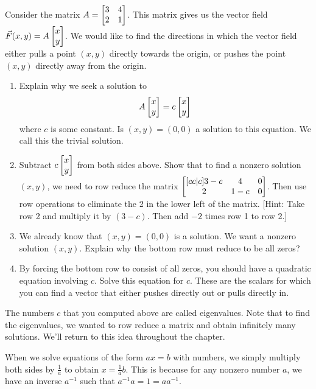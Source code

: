 \begin{problem}
Consider the matrix 
$A=\begin{bmatrix} 3&4\\2&1 \end{bmatrix}$.  
This matrix gives us the vector field 
$\vec F(x,y) = A\begin{bmatrix} x\\y \end{bmatrix}$. 
We would like to find the directions in which the vector field either pulls a point $(x,y)$ directly towards the origin, 
or pushes the point $(x,y)$ directly away from the origin.
\begin{enumerate}
 \item Explain why we seek a solution to $$ A\begin{bmatrix} x\\y \end{bmatrix} = c\begin{bmatrix} x\\y \end{bmatrix}$$ where $c$ is some constant. Is $(x,y)=(0,0)$ a solution to this equation.  We call this the trivial solution.
 \item Subtract $c\begin{bmatrix} x\\y \end{bmatrix}$ from both sides above.  Show that to find a nonzero solution $(x,y)$, we need to row reduce the matrix $\begin{bmatrix} [cc|c]3-c&4&0\\2&1-c&0 \end{bmatrix}$. Then use row operations to eliminate the 2 in the lower left of the matrix. [Hint: Take row 2 and multiply it by $(3-c)$.  Then add $-2$ times row 1 to row 2.]
 \item We already know that $(x,y)=(0,0)$ is a solution.  We want a nonzero solution $(x,y)$. Explain why the bottom row must reduce to be all zeros?
 \item By forcing the bottom row to consist of all zeros, you should have a quadratic equation involving $c$. Solve this equation for $c$.  
 These are the scalars for which you can find a vector that either pushes directly out or pulls directly in. 
\end{enumerate}
\end{problem}

The numbers $c$ that you computed above are called eigenvalues. Note that to find the eigenvalues, we wanted to row reduce a matrix and obtain infinitely many solutions. We'll return to this idea throughout the chapter.  

\mysubsection{\ideamul}

When we solve equations of the form $ax=b$ with numbers, we simply multiply both sides by $\frac{1}{a}$ to obtain $x=\frac{1}{a}b$. This is because for any nonzero number $a$, we have an inverse $a^{-1}$ such that $a^{-1}a = 1=aa^{-1}$. 
 

